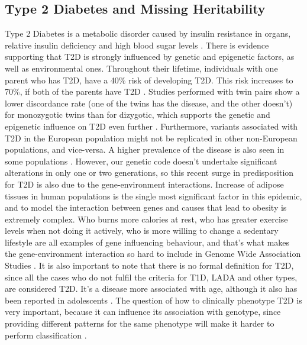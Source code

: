 \subsection{Type 2 Diabetes and Missing Heritability}

Type 2 Diabetes is a metabolic disorder caused by insulin resistance in organs, relative insulin deficiency and high blood sugar levels \cite{chatterjee2017type}. There is evidence supporting that \gls{T2D} is strongly influenced by genetic and epigenetic factors, as well as environmental ones. Throughout their lifetime, individuals with one parent who has \gls{T2D}, have a 40\% risk of developing \gls{T2D}. This risk increases to 70\%, if both of the parents have \gls{T2D} \cite{ali2013genetics,prasad2015genetics}. Studies performed with twin pairs show a lower discordance rate (one of the twins has the disease, and the other doesn't) for monozygotic twins than for dizygotic, which supports the genetic and epigenetic influence on \gls{T2D} even further \cite{willemsen2015concordance}. Furthermore, variants associated with \gls{T2D} in the European population might not be replicated in other non-European populations, and vice-versa. A higher prevalence of the disease is also seen in some populations \cite{sanghera2012type, prasad2015genetics, wang2016genetic}. However, our genetic code doesn't undertake significant alterations in only one or two generations, so this recent surge in predisposition for \gls{T2D} is also due to the gene-environment interactions. Increase of adipose tissues in human populations is the single most significant factor in this epidemic, and to model the interaction between genes and causes that lead to obesity is extremely complex. Who burns more calories at rest, who has greater exercise levels when not doing it actively, who is more willing to change a sedentary lifestyle are all examples of gene influencing behaviour, and that's what makes the gene-environment interaction so hard to include in Genome Wide Association Studies \cite{ali2013genetics}. It is also important to note that there is no formal definition for \gls{T2D}, since all the cases who do not fulfil the criteria for \gls{T1D}, \gls{LADA} and other types, are considered \gls{T2D}. It's a disease more associated with age, although it also has been reported in adolescents \cite{vijan2010type}. The question of how to clinically phenotype \gls{T2D} is very important, because it can influence its association with genotype, since providing different patterns for the same phenotype will make it harder to perform classification \cite{sanghera2012type}. 

